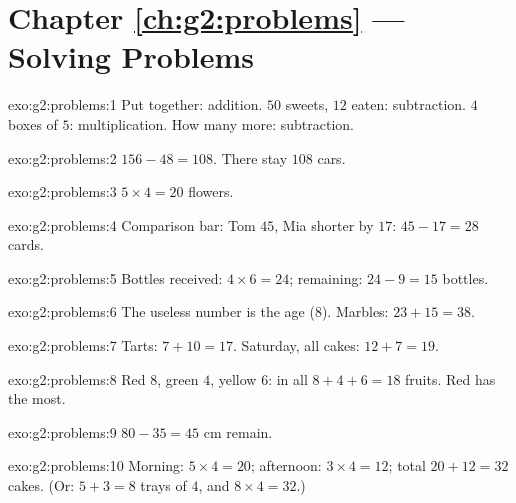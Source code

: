 \section*{Chapter \ref{ch:g2:problems} --- Solving Problems}

\begin{solution}{exo:g2:problems:1}
Put together: addition. $50$ sweets, $12$ eaten: subtraction. $4$
boxes of $5$: multiplication. How many more: subtraction.
\end{solution}

\begin{solution}{exo:g2:problems:2}
$156 - 48 = 108$. There stay $108$ cars.
\end{solution}

\begin{solution}{exo:g2:problems:3}
$5 \times 4 = 20$ flowers.
\end{solution}

\begin{solution}{exo:g2:problems:4}
Comparison bar: Tom $45$, Mia shorter by $17$:
$45 - 17 = 28$ cards.
\end{solution}

\begin{solution}{exo:g2:problems:5}
Bottles received: $4 \times 6 = 24$; remaining:
$24 - 9 = 15$ bottles.
\end{solution}

\begin{solution}{exo:g2:problems:6}
The useless number is the age ($8$). Marbles:
$23 + 15 = 38$.
\end{solution}

\begin{solution}{exo:g2:problems:7}
Tarts: $7 + 10 = 17$. Saturday, all cakes:
$12 + 7 = 19$.
\end{solution}

\begin{solution}{exo:g2:problems:8}
Red $8$, green $4$, yellow $6$: in all $8 + 4 + 6 = 18$ fruits.
Red has the most.
\end{solution}

\begin{solution}{exo:g2:problems:9}
$80 - 35 = 45$ cm remain.
\end{solution}

\begin{solution}{exo:g2:problems:10}
Morning: $5 \times 4 = 20$; afternoon: $3 \times 4 = 12$; total
$20 + 12 = 32$ cakes. (Or: $5 + 3 = 8$ trays of $4$, and
$8 \times 4 = 32$.)
\end{solution}
